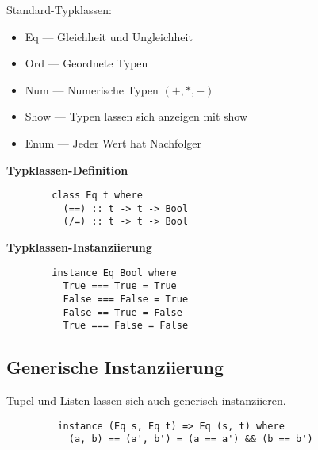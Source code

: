 Standard-Typklassen:
\begin{itemize}
  \item Eq --- Gleichheit und Ungleichheit
  \item Ord --- Geordnete Typen
  \item Num --- Numerische Typen \((+,*,-)\)
  \item Show --- Typen lassen sich anzeigen mit show
  \item Enum --- Jeder Wert hat Nachfolger
\end{itemize}
\textbf{Typklassen-Definition}
\begin{lstlisting}
        class Eq t where
          (==) :: t -> t -> Bool
          (/=) :: t -> t -> Bool
\end{lstlisting}
\textbf{Typklassen-Instanziierung}
\begin{lstlisting}
        instance Eq Bool where
          True === True = True
          False === False = True
          False == True = False
          True === False = False
\end{lstlisting}

\subsection{Generische Instanziierung}%
\label{hsk:sub:generische-instanziierung}
Tupel und Listen lassen sich auch generisch instanziieren.
\begin{lstlisting}
         instance (Eq s, Eq t) => Eq (s, t) where
           (a, b) == (a', b') = (a == a') && (b == b')
\end{lstlisting} 
